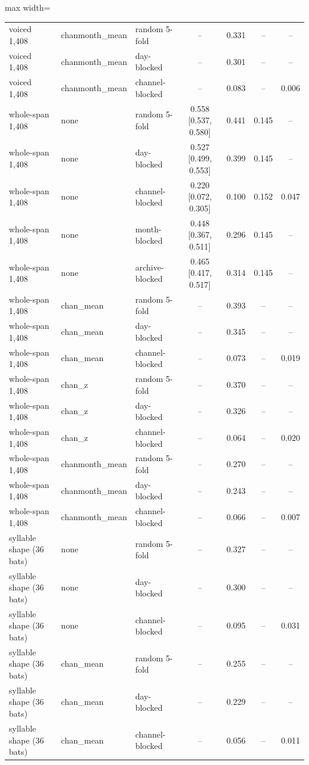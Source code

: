 \begin{table}[htbp]
\begin{adjustbox}{max width=\linewidth}
\begin{tabular}{lllcccc}
voiced 1,408 & chanmonth\_mean & random 5-fold & -- & 0.331 & -- & -- \\
voiced 1,408 & chanmonth\_mean & day-blocked & -- & 0.301 & -- & -- \\
voiced 1,408 & chanmonth\_mean & channel-blocked & -- & 0.083 & -- & 0.006 \\
whole-span 1,408 & none & random 5-fold & 0.558 [0.537, 0.580] & 0.441 & 0.145 & -- \\
whole-span 1,408 & none & day-blocked & 0.527 [0.499, 0.553] & 0.399 & 0.145 & -- \\
whole-span 1,408 & none & channel-blocked & 0.220 [0.072, 0.305] & 0.100 & 0.152 & 0.047 \\
whole-span 1,408 & none & month-blocked & 0.448 [0.367, 0.511] & 0.296 & 0.145 & -- \\
whole-span 1,408 & none & archive-blocked & 0.465 [0.417, 0.517] & 0.314 & 0.145 & -- \\
whole-span 1,408 & chan\_mean & random 5-fold & -- & 0.393 & -- & -- \\
whole-span 1,408 & chan\_mean & day-blocked & -- & 0.345 & -- & -- \\
whole-span 1,408 & chan\_mean & channel-blocked & -- & 0.073 & -- & 0.019 \\
whole-span 1,408 & chan\_z & random 5-fold & -- & 0.370 & -- & -- \\
whole-span 1,408 & chan\_z & day-blocked & -- & 0.326 & -- & -- \\
whole-span 1,408 & chan\_z & channel-blocked & -- & 0.064 & -- & 0.020 \\
whole-span 1,408 & chanmonth\_mean & random 5-fold & -- & 0.270 & -- & -- \\
whole-span 1,408 & chanmonth\_mean & day-blocked & -- & 0.243 & -- & -- \\
whole-span 1,408 & chanmonth\_mean & channel-blocked & -- & 0.066 & -- & 0.007 \\
syllable shape (36 bats) & none & random 5-fold & -- & 0.327 & -- & -- \\
syllable shape (36 bats) & none & day-blocked & -- & 0.300 & -- & -- \\
syllable shape (36 bats) & none & channel-blocked & -- & 0.095 & -- & 0.031 \\
syllable shape (36 bats) & chan\_mean & random 5-fold & -- & 0.255 & -- & -- \\
syllable shape (36 bats) & chan\_mean & day-blocked & -- & 0.229 & -- & -- \\
syllable shape (36 bats) & chan\_mean & channel-blocked & -- & 0.056 & -- & 0.011 \\

\end{tabular}
\end{adjustbox}
\end{table}
